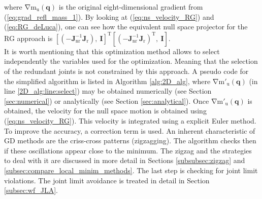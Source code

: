 where $\mathrm{\nabla m_u(\mathbf{q})}$ is the original eight-dimensional gradient from  (\ref{eq:grad_refl_mass_1}). 
By looking at (\ref{eq:ns_velocity_RG}) and (\ref{eq:RG_deLuca}), one can see how the equivalent null space projector for the RG approach is $\mathrm{\left[(-\mathbf{J}_{nr}^{-1} \mathbf{J}_r), \    \mathbf{I} \right ]^{T}  \left[(-\mathbf{J}_{nr}^{-1} \mathbf{J}_r)^{T}, \   \mathbf{I} \right ]  }$. \\
It is worth mentioning that this optimization method allows to select independently the variables used for the optimization. Meaning that the selection of the redundant joints is not constrained by this approach. 
A pseudo code for the simplified algorithm is listed in Algorithm \ref{alg:2D_alg}, where $\mathrm{\nabla m'_u(\mathbf{q})}$ (in line \ref{2D_alg:line:select}) may be obtained numerically (see Section \ref{sec:numerical}) or analytically (see Section \ref{sec:analytical}). Once $\mathrm{\nabla m'_u(\mathbf{q})}$ is obtained, the velocity for the null space motion is obtained using (\ref{eq:ns_velocity_RG}). This velocity is integrated using a explicit Euler method. To improve the accuracy, a correction term is used. An inherent characteristic of GD methods are the criss-cross patterns (zigzagging). The algorithm checks then if these oscillations appear  close to the minimum. The zigzag and the strategies to deal with it are discussed in more detail in Sections \ref{subsubsec:zigzag} and  \ref{subsec:compare_local_minim_methods}.
The last step is checking for joint limit violations. The joint limit avoidance is treated in detail in Section \ref{subsec:wf_JLA}.


